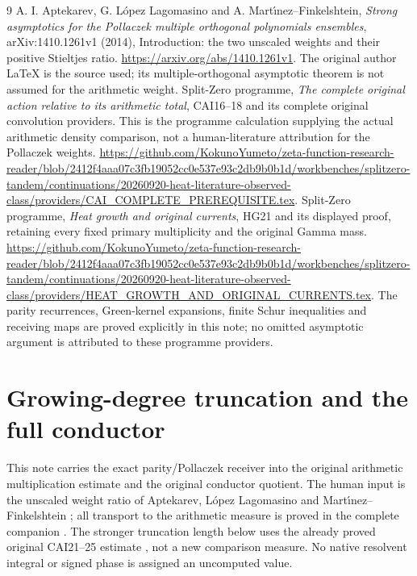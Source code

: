 \documentclass[11pt]{article}
\begin{document}
\begin{thebibliography}{9}
 A. I. Aptekarev, G. L\'opez Lagomasino and
A. Mart\'{\i}nez--Finkelshtein,
\emph{Strong asymptotics for the Pollaczek multiple orthogonal
polynomials ensembles}, arXiv:1410.1261v1 (2014), Introduction:
the two unscaled weights and their positive Stieltjes ratio.
\url{https://arxiv.org/abs/1410.1261v1}.
The original author LaTeX is the source used; its multiple-orthogonal
asymptotic theorem is not assumed for the arithmetic weight.
 Split-Zero programme, \emph{The complete original
action relative to its arithmetic total}, CAI16--18 and its complete original
convolution providers. This is the programme calculation supplying
the actual arithmetic density comparison, not a human-literature
attribution for the Pollaczek weights.
\url{https://github.com/KokunoYumeto/zeta-function-research-reader/blob/2412f4aaa07c3fb19052cc0e537e93c2db9b0b1d/workbenches/splitzero-tandem/continuations/20260920-heat-literature-observed-class/providers/CAI_COMPLETE_PREREQUISITE.tex}.
 Split-Zero programme, \emph{Heat growth and original
currents}, HG21 and its displayed proof, retaining every fixed
primary multiplicity and the original Gamma mass.
\url{https://github.com/KokunoYumeto/zeta-function-research-reader/blob/2412f4aaa07c3fb19052cc0e537e93c2db9b0b1d/workbenches/splitzero-tandem/continuations/20260920-heat-literature-observed-class/providers/HEAT_GROWTH_AND_ORIGINAL_CURRENTS.tex}.
The parity recurrences, Green-kernel expansions, finite Schur
inequalities and receiving maps are proved explicitly in this note;
no omitted asymptotic argument is attributed to these programme
providers.
\end{thebibliography}


\endgroup

\clearpage\begingroup
\part*{Growing-degree truncation and the full conductor}
\newcommand{\nativecutC}{\mathbb C}
\newcommand{\nativecutR}{\mathbb R}

This note carries the exact parity/Pollaczek receiver into the original
arithmetic multiplication estimate and the original conductor quotient.
The human input is the unscaled weight ratio of Aptekarev, L\'opez
Lagomasino and Mart\'{\i}nez--Finkelshtein \cite{nativecut:ALM}; all transport to
the arithmetic measure is proved in the complete companion \cite{nativecut:PP}.
The stronger truncation length below uses the already proved original
CAI21--25 estimate \cite{nativecut:CAI}, not a new comparison measure. No native
resolvent integral or signed phase is assigned an uncomputed value.
\end{document}
